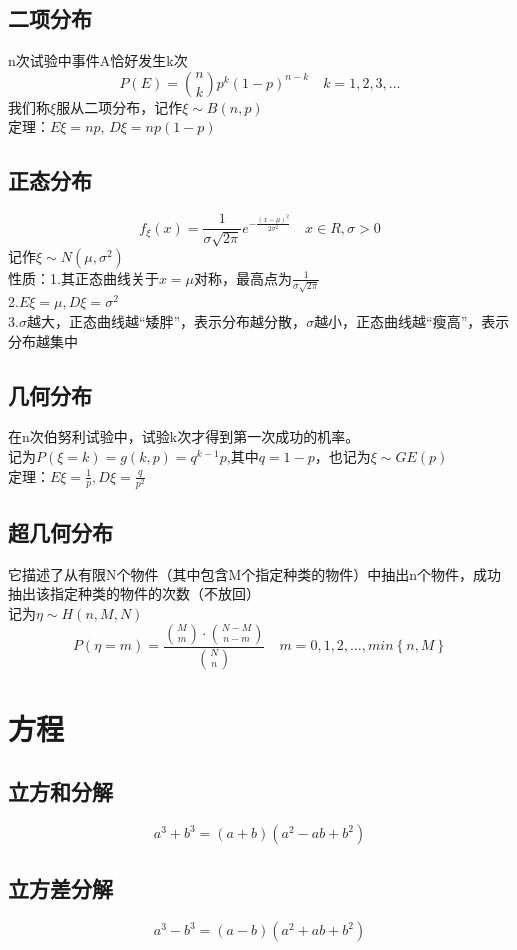 \documentclass[UTF8]{ctexart}
\begin{document}
		\subsection{二项分布}
			n次试验中事件A恰好发生k次
			\[P(E) ={n \choose k}p^k (1-p)^{n-k}\quad k=1,2,3,\dots\]
			我们称$\xi$服从二项分布，记作$\xi \sim B(n,p)$\\
			定理：$E\xi = np$,	$D\xi = np(1-p)$
		\subsection{正态分布}
			\[f_\xi (x)=\frac{1}{\sigma\sqrt{2\pi}}e^{-\frac{(x-\mu)^2}{2\sigma ^2}} \quad x\in R,\sigma>0\]
			记作$\xi \sim N(\mu,\sigma ^2)$\\
			性质：1.其正态曲线关于$x=\mu$对称，最高点为$\frac{1}{\sigma\sqrt{2\pi}}$\\
			2.$E\xi=\mu,D\xi=\sigma ^2$\\
			3.$\sigma$越大，正态曲线越“矮胖”，表示分布越分散，$\sigma$越小，正态曲线越“瘦高”，表示分布越集中
		\subsection{几何分布}
			在n次伯努利试验中，试验k次才得到第一次成功的机率。\\
			记为$P(\xi=k)=g(k,p)=q^{k-1}p$,其中$q=1-p$，也记为$\xi \sim GE(p)$\\
			定理：$E\xi=\frac{1}{p},D\xi=\frac{q}{p^2}$
		\subsection{超几何分布}
			它描述了从有限N个物件（其中包含M个指定种类的物件）中抽出n个物件，成功抽出该指定种类的物件的次数（不放回）\\
			记为$\eta \sim H(n,M,N)$
			\[P\left ( \eta=m\right ) = \frac{\binom{M}{m}\cdot \binom{N-M}{n-m}}{\binom{N}{n}}\quad m=0,1,2,\dots,min \left\{ n,M \right\}\]
	\section{方程}
		\subsection{立方和分解}
			\[a^3+b^3=(a+b)(a^2-ab+b^2)\]
		\subsection{立方差分解}
			\[a^3-b^3=(a-b)(a^2+ab+b^2)\]
\end{document}
